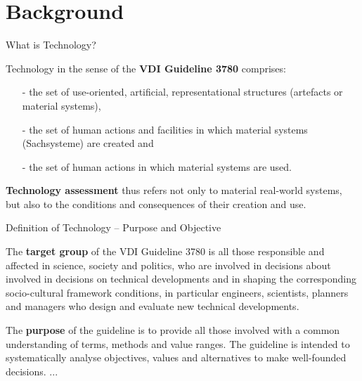 \documentclass{beamer}
\title{Modelling Sustainable Systems\\ and Semantic Web\\[6pt] Technology
  \vskip1em}
\subtitle{Lecture in the Module 10-202-2309\\ for Master Computer Science}
\author{Prof. Dr. Hans-Gert Gräbe\\
\url{http://www.informatik.uni-leipzig.de/~graebe}}
\date{April 2021}
\begin{document}
{
\begin{frame}
  \titlepage
\end{frame}}

\section{Background}
\begin{frame}{What is Technology?}

Technology in the sense of the \textbf{VDI Guideline 3780} comprises:
\begin{itemize}
\item[-] the set of use-oriented, artificial, representational structures
  (artefacts or material systems),
\item[-] the set of human actions and facilities in which material systems
  (Sachsysteme) are created and
\item[-] the set of human actions in which material systems are used.
\end{itemize}

  \textbf{Technology assessment} thus refers not only to material real-world
  systems, but also to the conditions and consequences of their creation and
  use.
\end{frame}

\begin{frame}{Definition of Technology -- Purpose and Objective}

The \textbf{target group} of the VDI Guideline 3780 is all those responsible
and affected in science, society and politics, who are involved in decisions
about involved in decisions on technical developments and in shaping the
corresponding socio-cultural framework conditions, in particular engineers,
scientists, planners and managers who design and evaluate new technical
developments.

The \textbf{purpose} of the guideline is to provide all those involved with a
common understanding of terms, methods and value ranges. The guideline is
intended to systematically analyse objectives, values and alternatives to make
well-founded decisions. ...

\end{frame}
\end{document}

